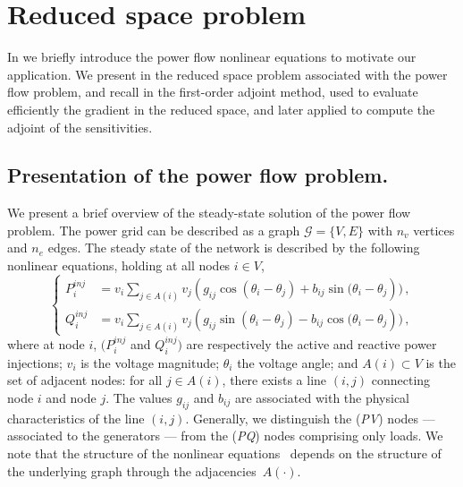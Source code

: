 \section{Reduced space problem}
In  we briefly introduce the power flow
nonlinear equations to motivate our application. We present in 
the reduced space problem associated with the power flow problem, and recall
in  the first-order adjoint method, used to evaluate
efficiently the gradient in the reduced space, and later applied to compute the adjoint of the sensitivities.

\subsection{Presentation of the power flow problem.}
\label{sec:background:powerflow}
We present a brief overview of the steady-state solution of the power flow
problem. The power grid can be described as a graph $\mathcal{G} = \{V, E\}$
with $n_v$ vertices and $n_e$ edges. The steady state of the network is described
by the following nonlinear equations, holding at all nodes $i \in V$,
\begin{equation}
  \label{eq:powerflow}
  \left\{
  \begin{aligned}
  P_i^{inj} &= v_i \sum_{j \in A(i)} v_j (g_{ij}\cos{(\theta_i - \theta_j)} + b_{ij}\sin{(\theta_i - \theta_j})) \,,  \\
  Q_i^{inj} &= v_i \sum_{j \in A(i)} v_j (g_{ij}\sin{(\theta_i - \theta_j)} - b_{ij}\cos{(\theta_i - \theta_j})) \,,
  \end{aligned}
  \right.
\end{equation}
where at node $i$, $(P_i^{inj}$ and  $Q_i^{inj})$ are respectively the active and
reactive power injections; $v_i$ is the voltage magnitude; $\theta_i$ the
voltage angle; and $A(i) \subset V$ is the set of adjacent nodes:
for all $j \in A(i)$, there exists a line $(i, j)$ connecting node $i$ and node $j$.
The values $g_{ij}$ and $b_{ij}$ are associated with the physical characteristics
of the line $(i, j)$. Generally, we distinguish the (\emph{PV}) nodes --- associated
to the generators --- from the  (\emph{PQ}) nodes comprising only loads.
We note that the structure of the nonlinear equations~ depends
on the structure of the underlying graph through the adjacencies~$A(\cdot)$.

